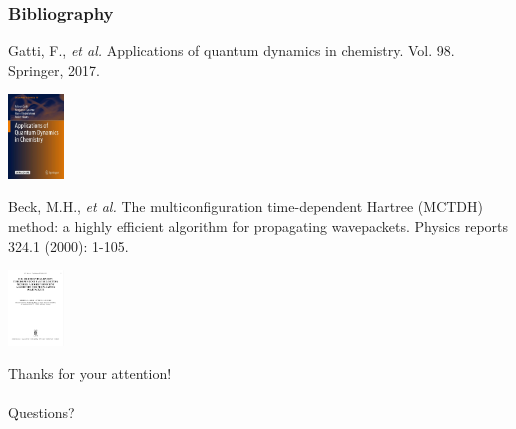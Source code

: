 \documentclass{beamer}
\begin{document}
\begin{frame}
  \frametitle{Bibliography}
  \centering
  \begin{minipage}{.6\linewidth}
Gatti, F., \emph{et al.} Applications of quantum dynamics in chemistry. Vol. 98.
  Springer, 2017.
\end{minipage}
\hspace{1cm}
  \begin{minipage}{.1\linewidth}
\includegraphics[width=4em]{appli.jpg}
\end{minipage}

\vspace{1cm}

  \begin{minipage}{.6\linewidth}
Beck, M.H., \emph{et al.} The multiconfiguration time-dependent Hartree (MCTDH) method: a highly efficient algorithm for propagating wavepackets. Physics reports 324.1 (2000): 1-105. 
\end{minipage}
\hspace{1cm}
  \begin{minipage}{.1\linewidth}
\includegraphics[width=4em]{mctdh_rev.png}
  \end{minipage}
\end{frame}

\begin{frame}
  \centering \Large
  Thanks for your attention!  \\~\\
  Questions?
\end{frame}
\end{document}
